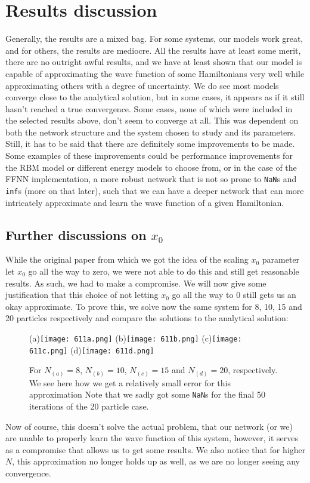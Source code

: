 \documentclass[12pt]{article}
\begin{document}
{\section{Results discussion}
Generally, the results are a mixed bag. For some systems, our models work great, and for others, the results are mediocre. All the results have at least some merit, there are no outright awful results, and we have at least shown that our model is capable of approximating the wave function of some Hamiltonians very well while approximating others with a degree of uncertainty. We do see most models converge close to the analytical solution, but in some cases, it appears as if it still hasn't reached a true convergence. Some cases, none of which were included in the selected results above, don't seem to converge at all. This was dependent on both the network structure and the system chosen to study and its parameters. Still, it has to be said that there are definitely some improvements to be made. Some examples of these improvements could be performance improvements for the RBM model or different energy models to choose from, or in the case of the FFNN implementation, a more robust network that is not so prone to \texttt{NaN}s and \texttt{inf}s (more on that later), such that we can have a deeper network that can more intricately approximate and learn the wave function of a given Hamiltonian.
\newpage
\subsection{Further discussions on $x_0$}
While the original paper \cite{jane} from which we got the idea of the scaling $x_0$ parameter let $x_0$ go all the way to zero, we were not able to do this and still get reasonable results. As such, we had to make a compromise. We will now give some justification that this choice of not letting $x_0$ go all the way to $0$ still gets us an okay approximate. To prove this, we solve now the same system for 8, 10, 15 and 20 particles respectively and compare the solutions to the analytical solution:
\begin{figure}[ht!]
    \centering
    \subfigure(a){\texttt{[image: 611a.png]}} 
    \subfigure(b){\texttt{[image: 611b.png]}}
    \newline
    \centering
    \subfigure(c){\texttt{[image: 611c.png]}}
    \subfigure(d){\texttt{[image: 611d.png]}}
    \caption{For $N_{(a)} = 8$, $N_{(b)} = 10$, $N_{(c)} = 15$ and $N_{(d)} = 20$, respectively.
    \newline We see here how we get a relatively small error for this approximation \newline
    Note that we sadly got some \texttt{NaN}s for the final 50 iterations of the 20 particle case.}
    \label{fig:611}
\end{figure}
\newline
Now of course, this doesn't solve the actual problem, that our network (or we) are unable to properly learn the wave function of this system, however, it serves as a compromise that allows us to get some results. We also notice that for higher $N$, this approximation no longer holds up as well, as we are no longer seeing any convergence.
}
\end{document}
